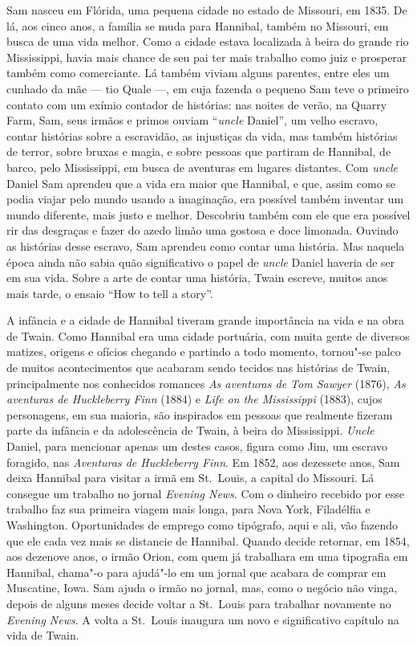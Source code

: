 Sam nasceu em Flórida, uma pequena cidade no estado de Missouri, em
1835. De lá, aos cinco anos, a família se muda para Hannibal, também no
Missouri, em busca de uma vida melhor. Como a cidade estava
localizada à beira do grande rio Mississippi, havia mais chance de seu pai ter
mais trabalho como juiz e prosperar também como comerciante.
Lá também viviam alguns parentes, entre eles um cunhado da mãe --- 
tio Quale ---, em cuja fazenda o pequeno Sam teve o primeiro contato com
um exímio contador de histórias: nas noites de verão, na
Quarry Farm, Sam, seus irmãos e primos ouviam ``\textit{uncle}
Daniel'', um velho escravo, contar histórias sobre a
escravidão, as injustiças da vida, mas também histórias de terror, sobre
bruxas e magia, e sobre pessoas que partiram de Hannibal, de barco, pelo
Mississippi, em busca de aventuras em lugares distantes. Com \textit{uncle} Daniel
Sam aprendeu que a vida era maior que Hannibal, e que, assim como se podia
viajar pelo mundo usando a imaginação, era possível também inventar um mundo
diferente, mais justo e melhor. Descobriu também com ele que era
possível rir das desgraças e fazer do azedo limão uma gostosa e doce
limonada. Ouvindo as histórias desse escravo, Sam aprendeu como
contar uma história. Mas naquela época ainda não sabia quão
significativo o papel de \textit{uncle} Daniel haveria de ser em sua vida. Sobre a
arte de contar uma história, Twain escreve, muitos anos mais tarde, o
ensaio ``How to tell a story''.

A infância e a cidade de Hannibal tiveram grande importância na vida e
na obra de Twain. Como Hannibal era uma cidade
portuária, com muita gente de diversos
matizes, origens e ofícios chegando e partindo a todo momento, tornou"-se
palco de muitos acontecimentos que acabaram sendo tecidos nas
histórias de Twain, principalmente nos conhecidos romances \textit{As aventuras de
Tom Sawyer} (1876), \textit{As aventuras de Huckleberry Finn} (1884) e
\textit{Life on the Mississippi} (1883), cujos personagens, em sua
maioria, são inspirados em pessoas que realmente fizeram parte da infância e
da adolescência de Twain, à beira do Mississippi. \textit{Uncle} Daniel, para mencionar apenas
um destes casos, figura como Jim, um escravo foragido, nas
\textit{Aventuras de Huckleberry Finn}. Em 1852, aos dezessete anos, Sam deixa
Hannibal para visitar a irmã em St.~Louis, a capital do Missouri. Lá
consegue um trabalho no jornal \textit{Evening News}. Com o dinheiro recebido por esse
trabalho faz sua primeira viagem mais longa, para Nova York, Filadélfia
e Washington. Oportunidades de emprego como tipógrafo, aqui e ali, vão
fazendo que ele cada vez mais se distancie de Hannibal. Quando decide retornar,
em 1854, aos dezenove anos, o irmão Orion, com quem já trabalhara
em uma tipografia em Hannibal, chama"-o para ajudá"-lo em um jornal que
acabara de comprar em Muscatine, Iowa. Sam ajuda o irmão no jornal, mas,
como o negócio não vinga, depois de alguns meses decide voltar a St.~Louis
para trabalhar novamente no \textit{Evening News}. A volta a St.~Louis inaugura 
um novo e significativo capítulo na vida de Twain.

